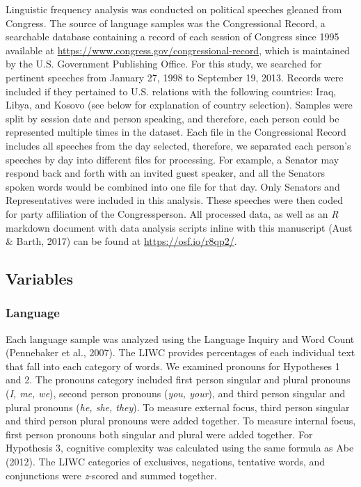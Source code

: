 \documentclass[english,,man,floatsintext]{apa6}
\begin{document}
Linguistic frequency analysis was conducted on political speeches gleaned from Congress. The source of language samples was the Congressional Record, a searchable database containing a record of each session of Congress since 1995 available at \url{https://www.congress.gov/congressional-record}, which is maintained by the U.S. Government Publishing Office. For this study, we searched for pertinent speeches from January 27, 1998 to September 19, 2013. Records were included if they pertained to U.S. relations with the following countries: Iraq, Libya, and Kosovo (see below for explanation of country selection). Samples were split by session date and person speaking, and therefore, each person could be represented multiple times in the dataset. Each file in the Congressional Record includes all speeches from the day selected, therefore, we separated each person's speeches by day into different files for processing. For example, a Senator may respond back and forth with an invited guest speaker, and all the Senators spoken words would be combined into one file for that day. Only Senators and Representatives were included in this analysis. These speeches were then coded for party affiliation of the Congressperson. All processed data, as well as an \emph{R} markdown document with data analysis scripts inline with this manuscript (Aust \& Barth, 2017) can be found at \url{https://osf.io/r8qp2/}.

\hypertarget{variables}{%
\subsection{Variables}\label{variables}}

\hypertarget{language}{%
\subsubsection{Language}\label{language}}

Each language sample was analyzed using the Language Inquiry and Word Count (Pennebaker et al., 2007). The LIWC provides percentages of each individual text that fall into each category of words. We examined pronouns for Hypotheses 1 and 2. The pronouns category included first person singular and plural pronouns (\emph{I, me, we}), second person pronouns (\emph{you, your}), and third person singular and plural pronouns (\emph{he, she, they}). To measure external focus, third person singular and third person plural pronouns were added together. To measure internal focus, first person pronouns both singular and plural were added together. For Hypothesis 3, cognitive complexity was calculated using the same formula as Abe (2012). The LIWC categories of exclusives, negations, tentative words, and conjunctions were \emph{z}-scored and summed together.
\end{document}
